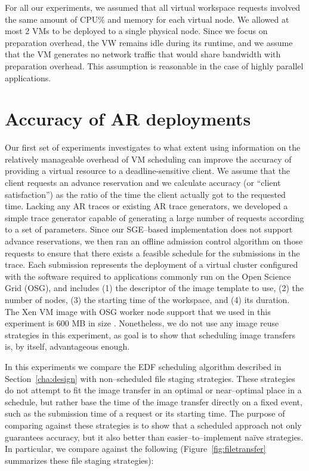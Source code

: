 For all our experiments, we assumed that all virtual workspace requests
involved the same amount of CPU\% and memory for each virtual node. We
allowed at most 2 VMs to be deployed to a single physical node. Since
we focus on preparation overhead, the VW remains idle during its
runtime, and we assume that the VM generates no network traffic that
would share bandwidth with preparation overhead. This assumption is
reasonable in the case of highly parallel applications.


\section{Accuracy of AR deployments}


Our first set of experiments investigates to what extent using
information on the relatively manageable overhead of VM scheduling can
improve the accuracy of providing a virtual resource to a
deadline{}-sensitive client. We assume that the client requests an advance reservation and we calculate accuracy (or
``client satisfaction'') as the ratio of the time the client actually
got to the requested time. Lacking any AR traces or existing AR trace generators,
we developed a simple trace generator capable of generating a large
number of requests according to a set of parameters. Since our SGE--based implementation does not support advance reservations, we then ran an
offline admission control algorithm on those requests to ensure that there exists a feasible
schedule for the submissions in the trace. Each submission represents
the deployment of a virtual cluster configured with the software
required to applications commonly run on the Open Science Grid (OSG),
and includes (1) the descriptor of the image template to use, (2) the
number of nodes, (3) the starting time of the workspace, and (4) its
duration. The Xen VM image with OSG worker node support that we used in
this experiment is 600 MB in size \cite{DBLP:conf/ccgrid/FosterFKSSZ06}. Nonetheless, we do not use any image reuse strategies in this experiment, as goal is to show that scheduling image transfers is, by itself, advantageous enough.

In this experiments we compare the EDF scheduling algorithm described in Section~\ref{cha:design} with non--scheduled file staging strategies. These strategies do not attempt to fit the image transfer in an optimal or near--optimal place in a schedule, but rather base the time of the image transfer directly on a fixed event, such as the submission time of a request or its starting time. The purpose of comparing against these strategies is to show that a scheduled approach not only guarantees accuracy, but it also better than easier--to--implement na\"ive strategies. In particular, we compare against the following (Figure~\ref{fig:filetransfer} summarizes these file staging strategies):

